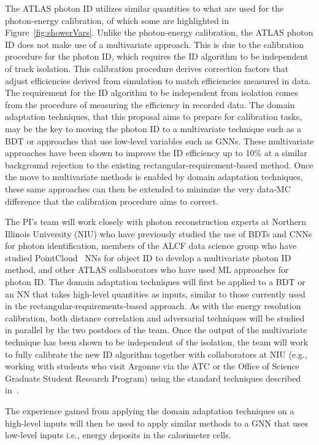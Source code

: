 \documentclass[letter, USenglish, 11pt, subfigure]{article}
\begin{document}
The ATLAS photon ID utilizes similar quantities to what are used for the photon-energy calibration, of which some are highlighted in Figure~\ref{fig:showerVars}. Unlike the photon-energy calibration, the ATLAS photon ID does not make use of a multivariate approach. This is due to the calibration procedure for the photon ID, which requires the ID algorithm to be independent of track isolation. This calibration procedure derives correction factors that adjust efficiencies derived from simulation to match efficiencies measured in data. The requirement for the ID algorithm to be independent from isolation comes from the procedure of measuring the efficiency in recorded data. The domain adaptation techniques, that this proposal aims to prepare for calibration tasks, may be the key to moving the photon ID to a multivariate technique such as a BDT or approaches that use low-level variables such as GNNs. These multivariate approaches have been shown to improve the ID efficiency up to 10\% at a similar background rejection to the existing rectangular-requirement-based method. Once the move to multivariate methods is enabled by domain adaptation techniques, these same approaches can then be extended to minimize the very data-MC difference that the calibration procedure aims to correct.

The PI's team will work closely with photon reconstruction experts at Northern Illinois University (NIU) who have previously studied the use of BDTs and CNNs for photon identification, members of the ALCF data science group who have studied PointCloud~\cite{ATL-PHYS-PUB-2021-002} NNs for object ID to develop a multivariate photon ID method, and other ATLAS collaborators who have used ML approaches for photon ID. The domain adaptation techniques will first be applied to a BDT or an NN that takes high-level quantities as inputs, similar to those currently used in the rectangular-requirements-based approach. As with the energy resolution calibration, both distance correlation and adversarial techniques will be studied in parallel by the two postdocs of the team. Once the output of the multivariate technique has been shown to be independent of the isolation, the team will work to fully calibrate the new ID algorithm together with collaborators at NIU (e.g., working with students who visit Argonne via the ATC or the Office of Science Graduate Student Research Program) using the standard techniques described in~\cite{PERF-2013-04,PERF-2017-02}.

The experience gained from applying the domain adaptation techniques on a high-level inputs will then be used to apply similar methods to a GNN that uses low-level inputs i.e., energy deposits in the calorimeter cells.
\end{document}
